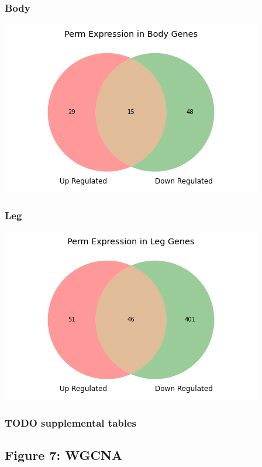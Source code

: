 \documentclass[11pt]{article}
\begin{document}
\subsubsection{Body}
\label{sec:orgdae8c46}
\begin{center}
\includegraphics[width=.9\linewidth]{figure6/PermBodyDeseq.png}
\end{center}
\subsubsection{Leg}
\label{sec:orgd72c1e6}
\begin{center}
\includegraphics[width=.9\linewidth]{figure6/PermLegDeseq.png}
\end{center}
\subsubsection{{\bfseries\sffamily TODO} supplemental tables}
\label{sec:orgc60d674}
\subsection{Figure 7: WGCNA}
\label{sec:org72176c5}
\end{document}

